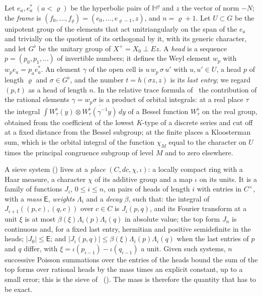 \documentclass[10pt]{amsart}
\theoremstyle{definition}
\theoremstyle{remark}
\begin{document}
Let $e_a,e_a^*$ $(a<\varrho)$ be the hyperbolic pairs of $\mathbb H^{\varrho}$ and $z$ the vector
of norm $-N$; the \emph{frame} is $(f_0,\dots,f_\varrho)=(e_0,\dots,e_{\varrho-1},z)$, and
$n=\varrho+1$. Let $U\subset G$ be the unipotent group of the elements that act unitriangularly
on the span of the $e_a$ and trivially on the quotient of its orthogonal by it, with its generic
character, and let $G^\flat$ be the unitary group of $X^+=X_0\perp Ez$. A \emph{head} is a
sequence $p=(p_0,p_1,\dots)$ of invertible numbers; it defines the Weyl element $w_p$ with
$w_pe_a=p_ae_a^*$. An element $\gamma$ of the open cell is $u\,w_p\,\sigma\,u'$ with $u,u'\in U$,
a head $p$ of length $\varrho$ and $\sigma\in G^\flat$, and the number $t=h(\sigma z,z)$ is its
\emph{last entry}; we regard $(p,t)$ as a head of length $n$. In the relative trace formula
of~\cite{P51} the contribution of the rational elements $\gamma=w_p\sigma$ is a product of orbital
integrals: at a real place $\tau$ the integral $\int W^\flat_\tau(y)\otimes
\overline{W^\flat_\tau(\gamma^{-1}y)}\,dy$ of a Bessel function $W^\flat_\tau$ on the real group,
obtained from the coefficient of the lowest $K$-type of a discrete series and cut off at a fixed
distance from the Bessel subgroup; at the finite places a Kloosterman sum, which is the orbital
integral of the function $\chi_M$ equal to the character on $U$ times the principal congruence
subgroup of level $M$ and to zero elsewhere.

A sieve system ({\cite[Definition~3.44]{P51}}) lives at a \emph{place} $(C,dc,\chi,\iota)$: a
locally compact ring with a Haar measure, a character $\chi$ of its additive group and a map
$\iota$ on its units. It is a family of functions $J_i$, $0\le i\le n$, on pairs of heads of
length $i$ with entries in $C^\times$, with a \emph{mass} $\mathsf E$, \emph{weights} $\Lambda_i$
and a \emph{decay} $\beta$, such that: the integral of $J_{i+1}((p,c),(q,c))$ over $c\in C$ is
$J_i(p,q)$, and its Fourier transform at a unit $\xi$ is at most $\beta(\xi)\Lambda_i(p)
\Lambda_i(q)$ in absolute value; the top form $J_n$ is continuous and, for a fixed last entry,
hermitian and positive semidefinite in the heads; $|J_0|\le\mathsf E$; and $|J_i(p,q)|\le
\beta(\xi)\Lambda_i(p)\Lambda_i(q)$ when the last entries of $p$ and $q$ differ, with
$\xi=\iota(p_{i-1})-\iota(q_{i-1})$ a unit. Given such systems, $n$ successive Poisson summations
over the entries of the heads bound the sum of the top forms over rational heads by the mass
times an explicit constant, up to a small error; this is the sieve of~\cite{P51}
({\cite[Theorem~3.50]{P51}}). The mass is
therefore the quantity that has to be exact.
\end{document}
